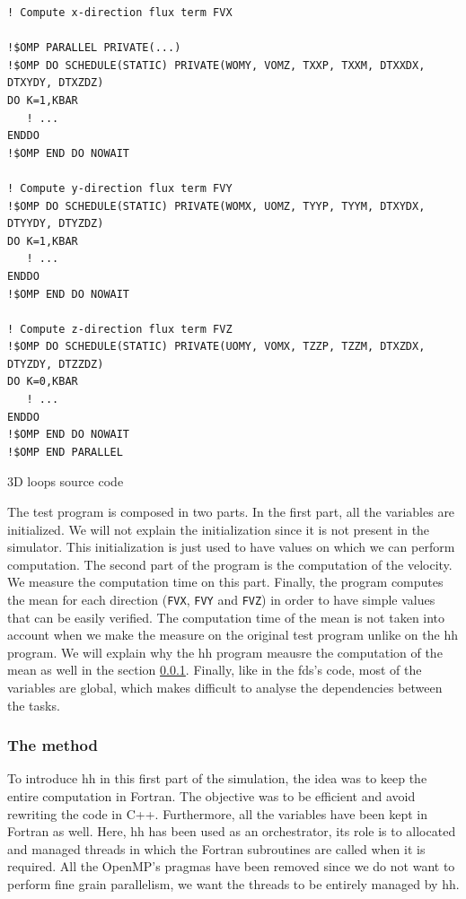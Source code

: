 \begin{listing}[ht!]
\begin{verbatim}
! Compute x-direction flux term FVX

!$OMP PARALLEL PRIVATE(...)
!$OMP DO SCHEDULE(STATIC) PRIVATE(WOMY, VOMZ, TXXP, TXXM, DTXXDX, DTXYDY, DTXZDZ)
DO K=1,KBAR
   ! ...
ENDDO
!$OMP END DO NOWAIT

! Compute y-direction flux term FVY
!$OMP DO SCHEDULE(STATIC) PRIVATE(WOMX, UOMZ, TYYP, TYYM, DTXYDX, DTYYDY, DTYZDZ)
DO K=1,KBAR
   ! ...
ENDDO
!$OMP END DO NOWAIT

! Compute z-direction flux term FVZ
!$OMP DO SCHEDULE(STATIC) PRIVATE(UOMY, VOMX, TZZP, TZZM, DTXZDX, DTYZDY, DTZZDZ)
DO K=0,KBAR
   ! ...
ENDDO
!$OMP END DO NOWAIT
!$OMP END PARALLEL
\end{verbatim}
\caption{3D loops source code}
\label{lst:3Dloopscode}
\end{listing}

The test program is composed in two parts. In the first part, all the variables
are initialized. We will not explain the initialization since it is not present
in the simulator. This initialization is just used to have values on which we
can perform computation. The second part of the program is the computation of
the velocity. We measure the computation time on this part. Finally, the program
computes the mean for each direction (\texttt{FVX}, \texttt{FVY} and
\texttt{FVZ}) in order to have simple values that can be easily verified. The
computation time of the mean is not taken into account when we make the measure
on the original test program unlike on the \gls{hh} program. We will explain why
the \gls{hh} program meausre the computation of the mean as well in the section
\ref{sec:3Dloopsmethod}. Finally, like in the \gls{fds}'s code, most of the
variables are global, which makes difficult to analyse the dependencies between
the tasks.

\subsubsection{The method}
\label{sec:3Dloopsmethod}

To introduce \gls{hh} in this first part of the simulation, the idea was to keep
the entire computation in Fortran. The objective was to be efficient and avoid
rewriting the code in C++. Furthermore, all the variables have been kept in
Fortran as well. Here, \gls{hh} has been used as an orchestrator, its role is to
allocated and managed threads in which the Fortran subroutines are called when
it is required. All the OpenMP's pragmas have been removed since we do not want
to perform fine grain parallelism, we want the threads to be entirely managed by
\gls{hh}.


